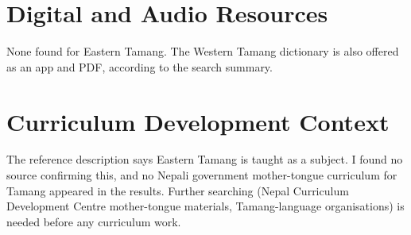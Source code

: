 \documentclass[12pt]{article}
\begin{document}
\section{Digital and Audio Resources}
None found for Eastern Tamang. The Western Tamang dictionary is also offered as an app and PDF, according to the search summary.
\section{Curriculum Development Context}
The reference description says Eastern Tamang is taught as a subject. I found no source confirming this, and no Nepali government mother-tongue curriculum for Tamang appeared in the results. Further searching (Nepal Curriculum Development Centre mother-tongue materials, Tamang-language organisations) is needed before any curriculum work.
\end{document}
